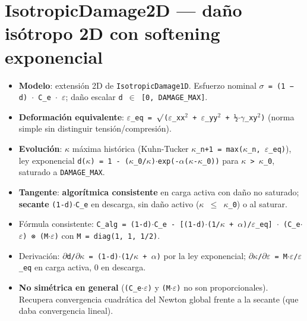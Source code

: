 \documentclass[11pt,letterpaper,oneside]{report}
\begin{document}
\section{IsotropicDamage2D --- daño isótropo 2D con softening exponencial}

\begin{itemize}
  \item \textbf{Modelo}: extensión 2D de \texttt{IsotropicDamage1D}. Esfuerzo nominal \texttt{\ensuremath{\sigma} = (1 − d) \ensuremath{\cdot} C\_e \ensuremath{\cdot} \ensuremath{\varepsilon}}; daño escalar \texttt{d \ensuremath{\in} [0, DAMAGE\_MAX]}.
  \item \textbf{Deformación equivalente}: \texttt{\ensuremath{\varepsilon}\_eq = \ensuremath{\surd}(\ensuremath{\varepsilon}\_xx\ensuremath{^{2}} + \ensuremath{\varepsilon}\_yy\ensuremath{^{2}} + ½\ensuremath{\cdot}\ensuremath{\gamma}\_xy\ensuremath{^{2}})} (norma simple sin distinguir tensión/compresión).
  \item \textbf{Evolución}: \ensuremath{\kappa} máxima histórica (Kuhn-Tucker \texttt{\ensuremath{\kappa}\_n+1 = max(\ensuremath{\kappa}\_n, \ensuremath{\varepsilon}\_eq)}), ley exponencial \texttt{d(\ensuremath{\kappa}) = 1 - (\ensuremath{\kappa}\_0/\ensuremath{\kappa})\ensuremath{\cdot}exp(-\ensuremath{\alpha}(\ensuremath{\kappa}-\ensuremath{\kappa}\_0))} para \texttt{\ensuremath{\kappa} > \ensuremath{\kappa}\_0}, saturado a \texttt{DAMAGE\_MAX}.
  \item \textbf{Tangente}: \textbf{algorítmica consistente} en carga activa con daño no saturado; \textbf{secante} \texttt{(1-d)\ensuremath{\cdot}C\_e} en descarga, sin daño activo (\texttt{\ensuremath{\kappa} \ensuremath{\le} \ensuremath{\kappa}\_0}) o al saturar.
  \item Fórmula consistente: \texttt{C\_alg = (1-d)\ensuremath{\cdot}C\_e - [(1-d)\ensuremath{\cdot}(1/\ensuremath{\kappa} + \ensuremath{\alpha})/\ensuremath{\varepsilon}\_eq] \ensuremath{\cdot} (C\_e\ensuremath{\cdot}\ensuremath{\varepsilon}) ⊗ (M\ensuremath{\cdot}\ensuremath{\varepsilon})} con \texttt{M = diag(1, 1, 1/2)}.
  \item Derivación: \texttt{\ensuremath{\partial}d/\ensuremath{\partial}\ensuremath{\kappa} = (1-d)\ensuremath{\cdot}(1/\ensuremath{\kappa} + \ensuremath{\alpha})} por la ley exponencial; \texttt{\ensuremath{\partial}\ensuremath{\kappa}/\ensuremath{\partial}\ensuremath{\varepsilon} = M\ensuremath{\cdot}\ensuremath{\varepsilon}/\ensuremath{\varepsilon}\_eq} en carga activa, 0 en descarga.
  \item \textbf{No simétrica en general} (\texttt{(C\_e\ensuremath{\cdot}\ensuremath{\varepsilon})} y \texttt{(M\ensuremath{\cdot}\ensuremath{\varepsilon})} no son proporcionales). Recupera convergencia cuadrática del Newton global frente a la secante (que daba convergencia lineal).

\end{itemize}
\end{document}
